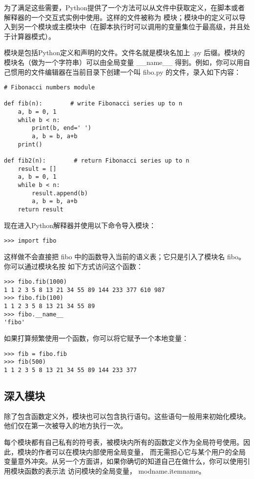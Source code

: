 \documentclass[UTF8]{ctexart}
\begin{document}
为了满足这些需要，Python提供了一个方法可以从文件中获取定义，在脚本或者解释器的一个交互式实例中使用。这样的文件被称为
模块；模块中的定义可以导入到另一个模块或主模块中（在脚本执行时可以调用的变量集位于最高级，并且处于计算器模式）。

模块是包括Python定义和声明的文件。文件名就是模块名加上 .py 后缀。模块的模块名（做为一个字符串）可以由全局变量
\_\_name\_\_ 得到。例如，你可以用自己惯用的文件编辑器在当前目录下创建一个叫 fibo.py 的文件，录入如下内容：
\begin{verbatim}
# Fibonacci numbers module

def fib(n):        # write Fibonacci series up to n
    a, b = 0, 1
    while b < n:
        print(b, end=' ')
        a, b = b, a+b
    print()

def fib2(n):        # return Fibonacci series up to n
    result = []
    a, b = 0, 1
    while b < n:
        result.append(b)
        a, b = b, a+b
    return result
\end{verbatim}

现在进入Python解释器并使用以下命令导入模块：
\begin{verbatim}
>>> import fibo
\end{verbatim}

这样做不会直接把 fibo 中的函数导入当前的语义表；它只是引入了模块名 fibo。你可以通过模块名按
如下方式访问这个函数：
\begin{verbatim}
>>> fibo.fib(1000)
1 1 2 3 5 8 13 21 34 55 89 144 233 377 610 987
>>> fibo.fib(100)
1 1 2 3 5 8 13 21 34 55 89
>>> fibo.__name__
'fibo'
\end{verbatim}

如果打算频繁使用一个函数，你可以将它赋予一个本地变量：
\begin{verbatim}
>>> fib = fibo.fib
>>> fib(500)
1 1 2 3 5 8 13 21 34 55 89 144 233 377
\end{verbatim}

\subsection{深入模块}
除了包含函数定义外，模块也可以包含执行语句。这些语句一般用来初始化模块。他们仅在第一次被导入的地方执行一次。

每个模块都有自己私有的符号表，被模块内所有的函数定义作为全局符号使用。因此，模块的作者可以在模块内部使用全局变量，
而无需担心它与某个用户的全局变量意外冲突。从另一个方面讲，如果你确切的知道自己在做什么，你可以使用引用模块函数的表示法
访问模块的全局变量， modname.itemname。
\end{document}
